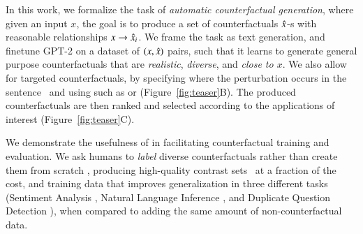 In this work, we formalize the task of \emph{automatic counterfactual generation}, where given an input $x$, the goal is to produce a set of counterfactuals $\hat{x}$-s with reasonable relationships $x \rightarrow \hat{x}_i$. 
We frame the task as text generation, and finetune GPT-2 \cite{radford2019language} on a dataset of  $(x, \hat{x})$ pairs, such that it learns to generate general purpose counterfactuals that are \emph{realistic}, \emph{diverse}, and \emph{close to $x$}.
We also allow for targeted counterfactuals, by specifying where the perturbation occurs in the sentence~\cite{donahue2020enabling} and using \tagstrs such as  or  (Figure~\ref{fig:teaser}B). 
The produced counterfactuals are then ranked and selected according to the applications of interest (Figure~\ref{fig:teaser}C).

We demonstrate the usefulness of \sysname in facilitating counterfactual training and evaluation. We ask humans to \emph{label} diverse counterfactuals rather than create them from scratch \cite{gardner2020contrast, kaushik2019learning}, producing high-quality contrast sets~\cite{gardner2020contrast} at a fraction of the cost, and training data that improves generalization in three different tasks (Sentiment Analysis \sst, Natural Language Inference \nli, and Duplicate Question Detection \qqp), when compared to adding the same amount of non-counterfactual data.




